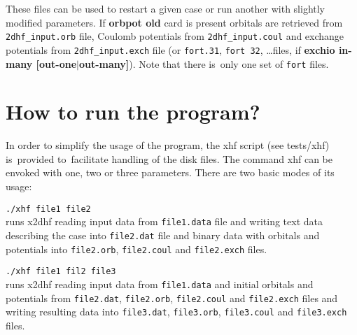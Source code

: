 \documentclass[12pt,a4paper]{article}
\begin{document}
These files can be used to restart a given case or run another with slightly modified
parameters. If \textbf{orbpot old} card is present orbitals are retrieved from
\texttt{2dhf\-\_in\-put\-.orb} file, Coulomb potentials from \texttt{2dhf\_input.coul} and
exchange potentials from \texttt{2dhf\_input.exch} file (or \texttt{fort.31}, \texttt{fort
  32}, \ldots files, if \textbf{exchio in-many [out-one$|$out-many]}). Note that there
is~only one set of \texttt{fort} files.

\bigskip

\section{How to run the program?}

\noindent
In order to simplify the usage of the program, the xhf script (see tests/xhf) is~provided
to~facilitate handling of the disk files.  The command xhf can be envoked with one, two or
three parameters. There are two basic modes of its usage:



\begin{description}
\item \hspace*{0.5cm} \texttt{./xhf file1 file2}\\ runs x2dhf reading
  input data from \texttt{file1.data} file and writing text data
  describing the case into \texttt{file2.dat} file and binary data
  with orbitals and potentials into \texttt{file2.orb},
  \texttt{file2.coul} and \texttt{file2.exch} files.
\end{description}


\begin{description}
\item \hspace*{0.5cm} \texttt{./xhf file1 fil2 file3}\\ runs x2dhf
  reading input data from \texttt{file1.data} and initial orbitals and
  potentials from \texttt{file2.dat}, \texttt{file2.orb},
  \texttt{file2.coul} and \texttt{file2.exch} files and writing
  resulting data into \texttt{file3.dat}, \texttt{file3.orb},
  \texttt{file3.coul} and \texttt{file3.exch} files.
\end{description}
\end{document}
